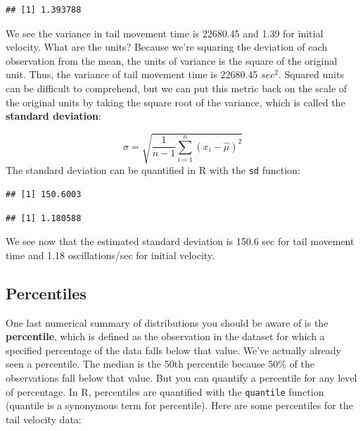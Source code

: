 \documentclass[
]{book}
\newenvironment{Shaded}{\begin{snugshade}}{\end{snugshade}}
\newcommand{\DocumentationTok}[1]{\textcolor[rgb]{0.56,0.35,0.01}{\textbf{\textit{#1}}}}
\newcommand{\FunctionTok}[1]{\textcolor[rgb]{0.13,0.29,0.53}{\textbf{#1}}}
\newcommand{\NormalTok}[1]{#1}
\newcommand{\SpecialCharTok}[1]{\textcolor[rgb]{0.81,0.36,0.00}{\textbf{#1}}}
\begin{document}
\begin{verbatim}
## [1] 1.393788
\end{verbatim}

We see the variance in tail movement time is 22680.45 and 1.39 for initial velocity. What are the units? Because we're squaring the deviation of each observation from the mean, the units of variance is the square of the original unit. Thus, the variance of tail movement time is 22680.45 \(sec^2\). Squared units can be difficult to comprehend, but we can put this metric back on the scale of the original units by taking the square root of the variance, which is called the \textbf{standard deviation}:

\[
\hat{\sigma} = \sqrt{\frac{1}{n-1} \sum_{i=1}^n (x_i - \hat{\mu})^2}
\]
The standard deviation can be quantified in R with the \texttt{sd} function:

\begin{Shaded}
\end{Shaded}

\begin{verbatim}
## [1] 150.6003
\end{verbatim}

\begin{Shaded}
\end{Shaded}

\begin{verbatim}
## [1] 1.180588
\end{verbatim}

We see now that the estimated standard deviation is 150.6 sec for tail movement time and 1.18 oscillations/sec for initial velocity.

\subsection{Percentiles}\label{percentiles}

One last numerical summary of distributions you should be aware of is the \textbf{percentile}, which is defined as the observation in the dataset for which a specified percentage of the data falls below that value. We've actually already seen a percentile. The median is the 50th percentile because 50\% of the observations fall below that value. But you can quantify a percentile for any level of percentage. In R, percentiles are quantified with the \texttt{quantile} function (quantile is a synonymous term for percentile). Here are some percentiles for the tail velocity data:
\end{document}

